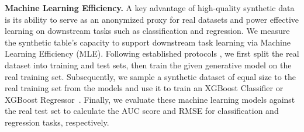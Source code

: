 \begin{table}[t]
\begin{threeparttable}
{{
  }
  }
\end{threeparttable}
\end{table} \textbf{Machine Learning Efficiency.} A key advantage of high-quality synthetic data is its ability to serve as an anonymized proxy for real datasets and power effective learning on downstream tasks such as classification and regression. We measure the synthetic table's capacity to support downstream task learning via Machine Learning Efficiency (MLE). Following established protocols \citep{stasy, codi, ctgan}, we first split the real dataset into training and test sets, then train the given generative model on the real training set. Subsequently, we sample a synthetic dataset of equal size to the real training set from the models and use it to train an XGBoost Classifier or XGBoost Regressor~\citep{xgboost}. Finally, we evaluate these machine learning models against the real test set to calculate the AUC score and RMSE for classification and regression tasks, respectively.

